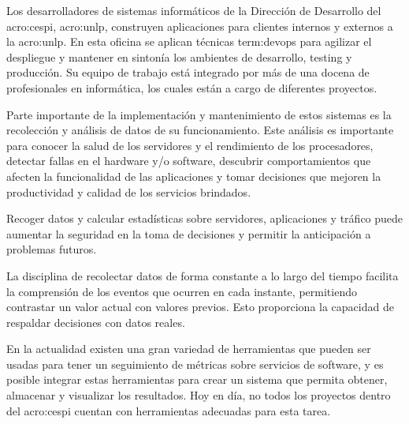 Los desarrolladores de sistemas informáticos de la Dirección de Desarrollo del
\gls{acro:cespi}, \gls{acro:unlp}, construyen aplicaciones para clientes
internos y externos a la \gls{acro:unlp}. En esta oficina se aplican técnicas
\gls{term:devops} para agilizar el despliegue y mantener en sintonía los
ambientes de desarrollo, testing y producción. Su equipo de trabajo está
integrado por más de una docena de profesionales en informática, los cuales
están a cargo de diferentes proyectos.

Parte importante de la implementación y mantenimiento de estos sistemas es la
recolección y análisis de datos de su funcionamiento. Este análisis es
importante para conocer la salud de los servidores y el rendimiento de los
procesadores, detectar fallas en el hardware y/o software, descubrir
comportamientos que afecten la funcionalidad de las aplicaciones y tomar
decisiones que mejoren la productividad y calidad de los servicios brindados.

Recoger datos y calcular estadísticas sobre servidores, aplicaciones y tráfico
puede aumentar la seguridad en la toma de decisiones y permitir la anticipación
a problemas futuros.

La disciplina de recolectar datos de forma constante a lo largo del tiempo
facilita la comprensión de los eventos que ocurren en cada instante,
permitiendo contrastar un valor actual con valores previos. Esto proporciona la
capacidad de respaldar decisiones con datos reales.

En la actualidad existen una gran variedad de herramientas que pueden ser
usadas para tener un seguimiento de métricas sobre servicios de software, y es
posible integrar estas herramientas para crear un sistema que permita obtener,
almacenar y visualizar los resultados. Hoy en día, no todos los proyectos
dentro del \gls{acro:cespi} cuentan con herramientas adecuadas para esta tarea.

